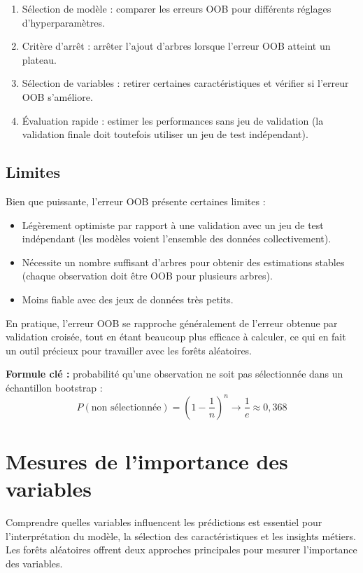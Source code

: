 \begin{enumerate}
    \item Sélection de modèle : comparer les erreurs OOB pour différents réglages d’hyperparamètres.
    \item Critère d’arrêt : arrêter l’ajout d’arbres lorsque l’erreur OOB atteint un plateau.
    \item Sélection de variables : retirer certaines caractéristiques et vérifier si l’erreur OOB s’améliore.
    \item Évaluation rapide : estimer les performances sans jeu de validation (la validation finale doit toutefois utiliser un jeu de test indépendant).
\end{enumerate}

\subsection{Limites}

Bien que puissante, l’erreur OOB présente certaines limites :
\begin{itemize}
    \item Légèrement optimiste par rapport à une validation avec un jeu de test indépendant (les modèles voient l’ensemble des données collectivement).
    \item Nécessite un nombre suffisant d’arbres pour obtenir des estimations stables (chaque observation doit être OOB pour plusieurs arbres).
    \item Moins fiable avec des jeux de données très petits.
\end{itemize}

En pratique, l’erreur OOB se rapproche généralement de l’erreur obtenue par validation croisée, tout en étant beaucoup plus efficace à calculer, ce qui en fait un outil précieux pour travailler avec les forêts aléatoires.

\medskip
\noindent
\textbf{Formule clé :} probabilité qu’une observation ne soit pas sélectionnée dans un échantillon bootstrap :
\[
P(\text{non sélectionnée}) = \left( 1 - \frac{1}{n} \right)^n \to \frac{1}{e} \approx 0,368
\]


\section{Mesures de l’importance des variables}

Comprendre quelles variables influencent les prédictions est essentiel pour l’interprétation du modèle, la sélection des caractéristiques et les insights métiers. Les forêts aléatoires offrent deux approches principales pour mesurer l’importance des variables.

